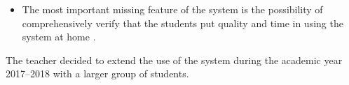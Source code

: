 \begin{itemize}

	\item The most important missing feature of the system is the possibility of comprehensively verify that the students put quality and time in using the system at home .

\end{itemize}


The teacher decided to extend the use of the system during the academic year 2017--2018 with a larger group of students. 
